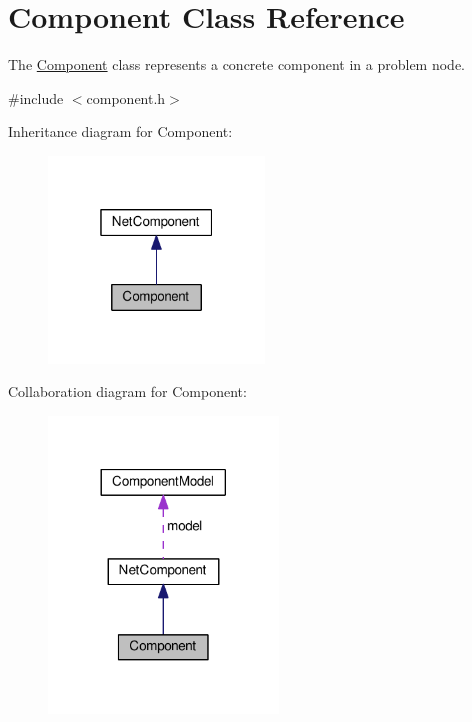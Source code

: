 \hypertarget{class_component}{}\section{Component Class Reference}
\label{class_component}


The \hyperlink{class_component}{Component} class represents a concrete component in a problem node.  




{\ttfamily \#include $<$component.\+h$>$}



Inheritance diagram for Component\+:\nopagebreak
\begin{figure}[H]
\begin{center}
\leavevmode
\includegraphics[width=163pt]{class_component__inherit__graph}
\end{center}
\end{figure}


Collaboration diagram for Component\+:\nopagebreak
\begin{figure}[H]
\begin{center}
\leavevmode
\includegraphics[width=173pt]{class_component__coll__graph}
\end{center}
\end{figure}

